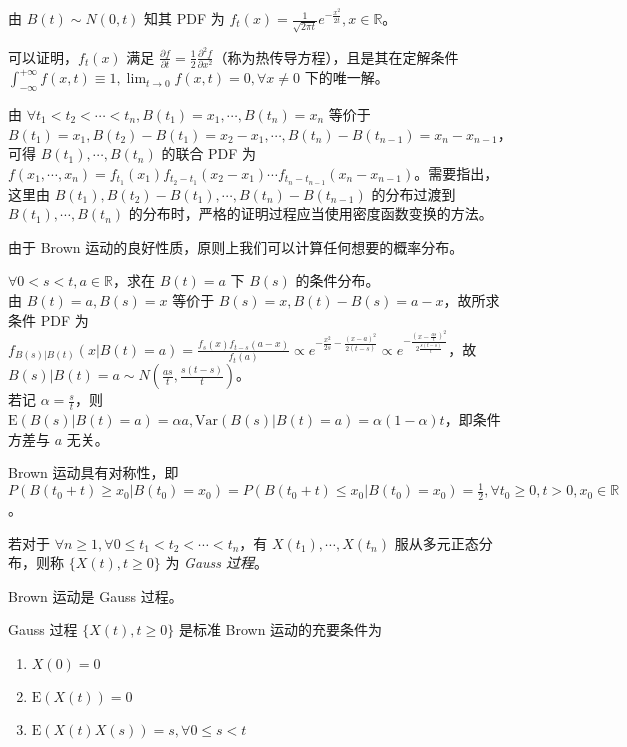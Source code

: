 \documentclass[../main.tex]{subfiles}
\begin{document}
由 $B(t)\sim N(0,t)$ 知其 PDF 为 $f_t(x)=\frac1{\sqrt{2\pi t}}e^{-\frac{x^2}{2t}},x\in\mathbb R$。

可以证明，$f_t(x)$ 满足 $\frac{\partial f}{\partial t}=\frac12\frac{\partial^2f}{\partial x^2}$（称为热传导方程），且是其在定解条件 $\int_{-\infty}^{+\infty}f(x,t)\equiv1,\lim_{t\rightarrow0}f(x,t)=0,\forall x\neq0$ 下的唯一解。

由 $\forall t_1<t_2<\cdots<t_n,B(t_1)=x_1,\cdots,B(t_n)=x_n$ 等价于 $B(t_1)=x_1,B(t_2)-B(t_1)=x_2-x_1,\cdots,B(t_n)-B(t_{n-1})=x_n-x_{n-1}$，可得 $B(t_1),\cdots,B(t_n)$ 的联合 PDF 为 $f(x_1,\cdots,x_n)=f_{t_1}(x_1)f_{t_2-t_1}(x_2-x_1)\cdots f_{t_n-t_{n-1}}(x_n-x_{n-1})$。需要指出，这里由 $B(t_1),B(t_2)-B(t_1),\cdots,B(t_n)-B(t_{n-1})$ 的分布过渡到 $B(t_1),\cdots,B(t_n)$ 的分布时，严格的证明过程应当使用密度函数变换的方法。

由于 Brown 运动的良好性质，原则上我们可以计算任何想要的概率分布。

\begin{example}
    $\forall0<s<t,a\in\mathbb R$，求在 $B(t)=a$ 下 $B(s)$ 的条件分布。\\
    由 $B(t)=a,B(s)=x$ 等价于 $B(s)=x,B(t)-B(s)=a-x$，故所求条件 PDF 为 $f_{B(s)|B(t)}(x|B(t)=a)=\frac{f_s(x)f_{t-s}(a-x)}{f_t(a)}\propto e^{-\frac{x^2}{2s}-\frac{(x-a)^2}{2(t-s)}}\propto e^{-\frac{(x-\frac{as}t)^2}{2\frac{s(t-s)}t}}$，故 $B(s)|B(t)=a\sim N(\frac{as}t,\frac{s(t-s)}t)$。\\
    若记 $\alpha=\frac st$，则 $\mathrm E(B(s)|B(t)=a)=\alpha a,\mathrm{Var}(B(s)|B(t)=a)=\alpha(1-\alpha)t$，即条件方差与 $a$ 无关。
\end{example}

\begin{proposition}
    Brown 运动具有对称性，即 $P(B(t_0+t)\geq x_0|B(t_0)=x_0)=P(B(t_0+t)\leq x_0|B(t_0)=x_0)=\frac12,\forall t_0\geq0,t>0,x_0\in\mathbb R$。
\end{proposition}

\begin{definition}\label{def:8.2.1}
    若对于 $\forall n\geq1,\forall0\leq t_1<t_2<\cdots<t_n$，有 $X(t_1),\cdots,X(t_n)$ 服从多元正态分布，则称 $\{X(t),t\geq0\}$ 为 \emph{Gauss 过程}。
\end{definition}

Brown 运动是 Gauss 过程。

\begin{theorem}\label{thm:8.2.1}
    Gauss 过程 $\{X(t),t\geq0\}$ 是标准 Brown 运动的充要条件为
    \begin{enumerate}
        \item $X(0)=0$
        \item $\mathrm E(X(t))=0$
        \item $\mathrm E(X(t)X(s))=s,\forall0\leq s<t$
    \end{enumerate}
\end{theorem}
\end{document}
